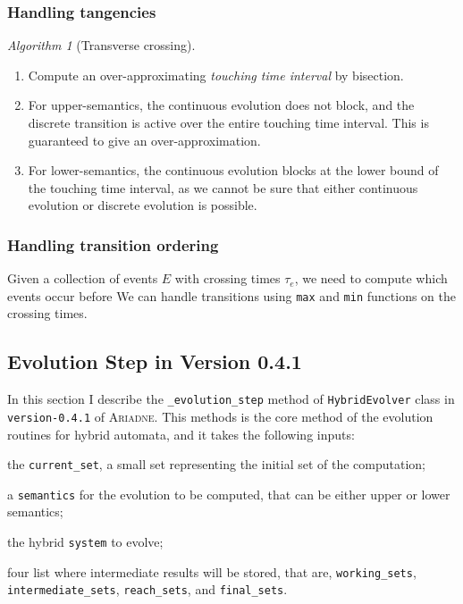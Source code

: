 \documentclass[english,a4paper]{article}
\newcommand{\ARIADNE}{\textsc{Ariadne}\xspace}
\theoremstyle{theorem}
\theoremstyle{definition}
\theoremstyle{remark}
\newtheorem*{algorithm*}{Algorithm}
\begin{document}
\subsubsection*{Handling tangencies}

\begin{algorithm*}[Transverse crossing]\mbox{}
\begin{enumerate}
\item Compute an over-approximating \emph{touching time interval} by bisection.
\item For upper-semantics, the continuous evolution does not block, and the discrete transition is active over the entire touching time interval. This is guaranteed to give an over-approximation.
\item For lower-semantics, the continuous evolution blocks at the lower bound of the touching time interval, as we cannot be sure that either continuous evolution or discrete evolution is possible.
\end{enumerate}
\end{algorithm*}

\subsubsection*{Handling transition ordering}

Given a collection of events $E$ with crossing times $\tau_e$, we need to compute which events occur before We can handle transitions using \texttt{max} and \texttt{min} functions on the crossing times.

\subsection*{Evolution Step in Version 0.4.1}

\noindent In this section I describe the \texttt{\_evolution\_step} method of \texttt{HybridEvolver} class in \texttt{version-0.4.1} of \ARIADNE. This methods is the core method of the evolution routines for hybrid automata, and it takes the following inputs:

\begin{compactitem}
	\item the \texttt{current\_set}, a small set representing the initial set of the computation;
	\item a \texttt{semantics} for the evolution to be computed, that can be either upper or lower semantics;
	\item the hybrid \texttt{system} to evolve;
	\item four list where intermediate results will be stored, that are, \texttt{working\_sets}, \texttt{intermediate\_sets}, \texttt{reach\_sets}, and \texttt{final\_sets}.
\end{compactitem}
\end{document}
